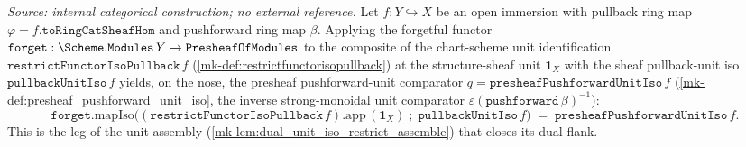 \begin{lemma}\label{mk-lem:forget_unit_restrict_eq_pushforward_unit}
  \leanok

  \textit{Source: internal categorical construction; no external reference.}
  Let \(f : Y \hookrightarrow X\) be an open immersion with pullback ring map
  \(\varphi = f.\mathtt{toRingCatSheafHom}\) and pushforward ring map \(\beta\). Applying the
  forgetful functor \(\mathtt{forget} : \Scheme.\mathtt{Modules}\,Y \to \mathtt{PresheafOfModules}\)
  to the composite of the chart-scheme unit identification
  \(\mathtt{restrictFunctorIsoPullback}\,f\) (\ref{mk-def:restrictfunctorisopullback}) at the
  structure-sheaf unit \(\mathbf 1_X\) with the sheaf pullback-unit iso \(\mathtt{pullbackUnitIso}\,f\)
  yields, on the nose, the presheaf pushforward-unit comparator
  \(q = \mathtt{presheafPushforwardUnitIso}\,f\) (\ref{mk-def:presheaf_pushforward_unit_iso}, the inverse
  strong-monoidal unit comparator \(\varepsilon(\mathtt{pushforward}\,\beta)^{-1}\)):
  \[
    \mathtt{forget}.\mathrm{mapIso}\bigl(
      (\mathtt{restrictFunctorIsoPullback}\,f).\mathrm{app}\,(\mathbf 1_X)
        \;\mathbin{;}\; \mathtt{pullbackUnitIso}\,f\bigr)
      \;=\; \mathtt{presheafPushforwardUnitIso}\,f .
  \]
  This is the leg of the unit assembly (\ref{mk-lem:dual_unit_iso_restrict_assemble}) that closes its
  dual flank.
\end{lemma}
